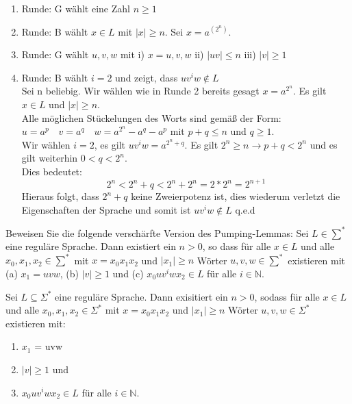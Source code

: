 \documentclass[10pt, a4paper]{exam}
\begin{document}
\begin{questions}
    \begin{solution}
        \begin{enumerate}
            \item Runde: G wählt eine Zahl $n\geq 1$
            \item Runde: B wählt $x\in L$ mit $\mid x\mid\geq n$. Sei $x = a^{(2^n)}$.
            \item Runde: G wählt $u,v,w$ mit i) $x = u,v,w$ ii) $\mid uv\mid\leq n$ iii) $\mid v\mid\geq 1$
            \item Runde: B wählt $i = 2$ und zeigt, dass $uv^iw \not\in L$ \\
                  Sei n beliebig. Wir wählen wie in Runde 2 bereits gesagt $x=a^{2^n}$. Es gilt $x\in L$ und $\mid x\mid\geq n$.\\
                  Alle möglichen Stückelungen des Worts sind gemäß der Form: $ u = a^p \quad v = a^q \quad w = a^{2^n}-a^q-a^p$
                  mit $p+q \leq n$ und $q\geq 1$.\\
                  Wir wählen $i=2$, es gilt $uv^iw = a^{{2^n}+q}$. Es gilt $2^n \geq n \rightarrow p+q < 2^n$ und es gilt weiterhin $0 < q < 2^n$.\\
                  Dies bedeutet:$$2^n < 2^n+q < 2^n+2^n = 2*2^n = 2^{n+1}$$
                  Hieraus folgt, dass $2^n+q$ keine Zweierpotenz ist, dies wiederum verletzt die Eigenschaften der Sprache und somit ist $uv^iw \notin L$ q.e.d
        \end{enumerate}
    \end{solution}

    \question Beweisen Sie die folgende verschärfte Version des Pumping-Lemmas: Sei $L\in\sum^*$ eine reguläre Sprache. Dann existiert ein $n>0$, so dass für alle $x\in L$ und alle $x_0,x_1,x_2\in\sum^*$ mit $x=x_0x_1x_2$ und $|x_1|\geq n$ Wörter $u, v, w \in\sum^*$ existieren mit (a) $x_1 = uvw$, (b) $|v| \geq 1$ und
    (c) $x_0 uv^i wx_2\in L$ für alle $i\in\mathbb{N}$.

    \begin{solution}
        Sei $L\subseteq\Sigma^*$ eine reguläre Sprache. Dann exisitiert ein $n>0$, sodass für alle $x\in L$ und alle $x_0,x_1,x_2 \in \Sigma^*$ mit $x = x_0x_1x_2$ und $\mid x_1 \mid \geq n$ Wörter $u,v,w\in \Sigma^*$ existieren mit:
        \begin{enumerate}
            \item $x_1$ = uvw
            \item $\mid v \mid \geq 1$ und
            \item $x_0uv^iwx_2 \in L$ für alle $i\in\mathbb{N}$.
        \end{enumerate}


\end{solution}
\end{questions}
\end{document}
